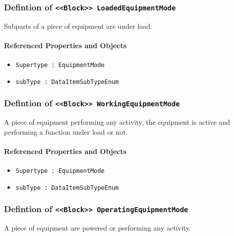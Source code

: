 \subsubsection{Defintion of \texttt{<<Block>> LoadedEquipmentMode}}
  \label{type:LoadedEquipmentMode}

\FloatBarrier

Subparts of a piece of equipment are under load.

\FloatBarrier
\paragraph{Referenced Properties and Objects}

\begin{itemize}
\item \texttt{Supertype : EquipmentMode}

\item \texttt{subType : DataItemSubTypeEnum}

\end{itemize}
\FloatBarrier
\subsubsection{Defintion of \texttt{<<Block>> WorkingEquipmentMode}}
  \label{type:WorkingEquipmentMode}

\FloatBarrier

A piece of equipment performing any activity, the equipment is active and performing a function under load or not.

\FloatBarrier
\paragraph{Referenced Properties and Objects}

\begin{itemize}
\item \texttt{Supertype : EquipmentMode}

\item \texttt{subType : DataItemSubTypeEnum}

\end{itemize}
\FloatBarrier
\subsubsection{Defintion of \texttt{<<Block>> OperatingEquipmentMode}}
  \label{type:OperatingEquipmentMode}

\FloatBarrier

A piece of equipment are powered or performing any activity.


